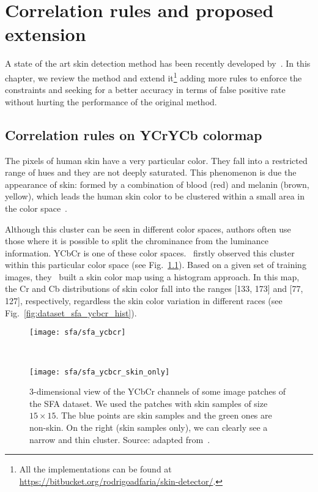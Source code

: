 \chapter{Correlation rules and proposed extension}
\label{cap:proposed-solution}

\noindent A state of the art skin detection method has been recently developed by~\cite{brancati:17}. In this chapter, we review the method and extend it\footnote{All the implementations can be found at \url{https://bitbucket.org/rodrigoadfaria/skin-detector/}.} adding more rules to enforce the constraints and seeking for a better accuracy in terms of false positive rate without hurting the performance of the original method.


\section{Correlation rules on YCrYCb colormap}
\label{sec:correlation_rules_ycrycb}
The pixels of human skin have a very particular color. They fall into a restricted range of hues and they are not deeply saturated. This phenomenon is due the appearance of skin: formed by a combination of blood (red) and melanin (brown, yellow), which leads the human skin color to be clustered within a small area in the color space~\citep{fleck:96}.

Although this cluster can be seen in different color spaces, authors often use those where it is possible to split the chrominance from the luminance information. YCbCr is one of these color spaces. \citet{chai:99}~firstly observed this cluster within this particular color space (see Fig.~\ref{fig:dataset_sfa_ycbcr}). Based on a given set of training images, they~\citep{chai:99} built a skin color map using a histogram approach. In this map, the Cr and Cb distributions of skin color fall into the ranges [133, 173] and [77, 127], respectively, regardless the skin color variation in different races (see Fig.~\ref{fig:dataset_sfa_ycbcr_hist}).

\begin{figure}[!ht]
    \centering
    \begin{minipage}{0.485\textwidth}
        \texttt{[image: sfa/sfa\_ycbcr]}
    \end{minipage}
    ~ %
    \begin{minipage}{0.485\textwidth}
        \texttt{[image: sfa/sfa\_ycbcr\_skin\_only]}
    \end{minipage}
    \caption[3-dimensional view of the YCbCr channels of some image patches of the SFA dataset]{3-dimensional view of the YCbCr channels of some image patches of the SFA dataset. We used the patches with skin samples of size $15 \times 15$. The blue points are skin samples and the green ones are non-skin. On the right (skin samples only), we can clearly see a narrow and thin cluster. Source: adapted from~\citet{chai:99}.}
    \label{fig:dataset_sfa_ycbcr}
\end{figure}

